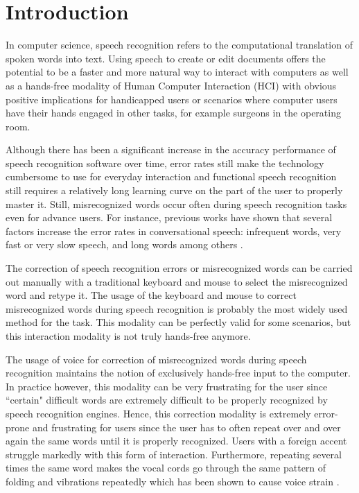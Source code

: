 \documentclass[]{article}
\begin{document}
\section{Introduction}
In computer science, speech recognition refers to the computational translation of spoken words into text.
Using speech to create or edit documents offers the potential to be a faster and more natural way to interact
with computers as well as a hands-free modality of Human Computer Interaction (HCI) with obvious positive implications
for handicapped users or scenarios where computer users have their hands engaged in other tasks, for example surgeons in
the operating room.


Although there has been a significant increase in the accuracy performance of speech recognition software over time,
error rates still make the technology cumbersome to use for everyday interaction and functional speech recognition still
requires a relatively long learning curve on the part of the user to properly master it. Still, misrecognized words
occur often during speech recognition tasks even for advance users. For instance, previous works have shown that several
factors increase the error rates in conversational speech: infrequent words, very fast or very slow speech, and long
words among others \cite{Goldwater2010181}.


The correction of speech recognition errors or misrecognized words can be carried out manually with a traditional
keyboard and mouse to select the misrecognized word and retype it. The usage  of the keyboard and mouse to correct
misrecognized words  during speech recognition is probably the most widely used method for the task. This modality can
be perfectly valid for some scenarios, but this interaction modality is not truly hands-free anymore.


The usage of voice for correction of misrecognized words during speech recognition maintains the notion of exclusively
hands-free input to the computer. In practice however, this modality can be very frustrating for the user since
``certain" difficult words are extremely difficult to be properly recognized by speech recognition engines. Hence, this
correction modality is extremely error-prone and frustrating for users since the user has to often repeat over and over
again the same words until it is properly recognized. Users with a foreign accent struggle markedly with this form of
interaction. Furthermore, repeating several times the same word makes the vocal cords go through the same pattern of
folding and vibrations repeatedly which has been shown to cause voice strain \cite{voiceproblems}.
\end{document}
